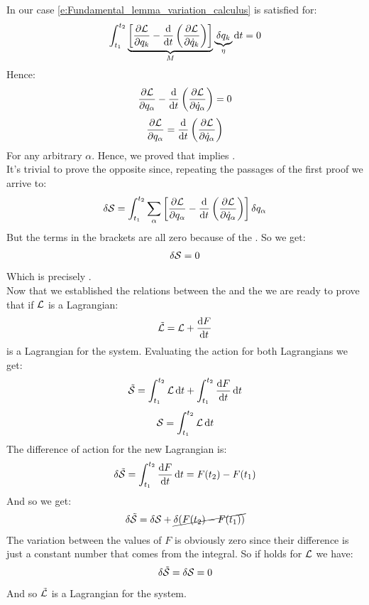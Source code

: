In our case \eqref{e:Fundamental_lemma_variation_calculus} is satisfied for:
\begin{equation}
    \int_{t_1}^{t_2}\underbrace{\left[\dfrac{\partial \lagr}{\partial q_{k}} - \dv{}{t}\brackets{\dfrac{\partial \lagr}{\partial \dot{q}_{k}}}\right]}_{M} \underbrace{\delta q_{k}}_{\eta} \dd{t} = 0
\end{equation}
Hence:
\begin{equation}
    \pdv{\lagr}{q_{\alpha}} - \dv{}{t}\brackets{\pdv{\lagr}{\dot{q}_{\alpha}}} = 0
\end{equation}
\begin{equation}
    \pdv{\lagr}{q_{\alpha}} = \dv{}{t}\brackets{\pdv{\lagr}{\dot{q}_{\alpha}}}
\end{equation}
For any arbitrary $\alpha$. Hence, we proved that \hpquotemath\;implies \eleref.\\
It's trivial to prove the opposite since, repeating the passages of the first proof we arrive to:
\begin{equation}
    \delta \action = \int_{t_1}^{t_2}\bigsum_{\alpha}\left[\pdv{\lagr}{q_{\alpha}} - \dv{}{t}\brackets{\pdv{\lagr}{\dot{q}_{\alpha}}}\right] \delta q_{\alpha}
\end{equation}
But the terms in the brackets are all zero because of the \eleref. So we get:
\begin{equation}
    \delta \mathcal{S} = 0
\end{equation}
Which is precisely \hpquotemath.\\
Now that we established the relations between the \eleref\;and the \hpquotemath\;we are ready to prove that if $\mathcal{L}$ is a Lagrangian:
\begin{equation}
    \tilde{\mathcal{L}} = \mathcal{L} + \dfrac{\dd{F}}{\dd{t}}
\end{equation}
is a Lagrangian for the system. Evaluating the action for both Lagrangians we get:
\begin{equation}
    \tilde{\mathcal{S}} = \int_{t_1}^{t_2}\mathcal{L} \dd{t} + \int_{t_1}^{t_2}\dfrac{\dd{F}}{\dd{t}} \dd{t}
\end{equation}
\begin{equation}
    \mathcal{S} = \int_{t_1}^{t_2}\mathcal{L} \dd{t}
\end{equation}
The difference of action for the new Lagrangian is:
\begin{equation}
    \delta \tilde{\mathcal{S}} = \int_{t_1}^{t_2}\dfrac{\dd{F}}{\dd{t}} \dd{t} = F(t_2) - F(t_1)
\end{equation}
And so we get:
\begin{equation}
    \delta \tilde{\mathcal{S}} = \delta \mathcal{S} + \cancel{\delta(F(t_2) - F(t_1))}
\end{equation}
The variation between the values of $F$ is obviously zero since their difference is just a constant number that comes from the integral. So if \hpquotemath\;holds for $\mathcal{L}$ we have:
\begin{equation}
    \delta \tilde{\mathcal{S}} = \delta \mathcal{S} = 0
\end{equation}
And so $\tilde{\mathcal{L}}$ is a Lagrangian for the system.\\
